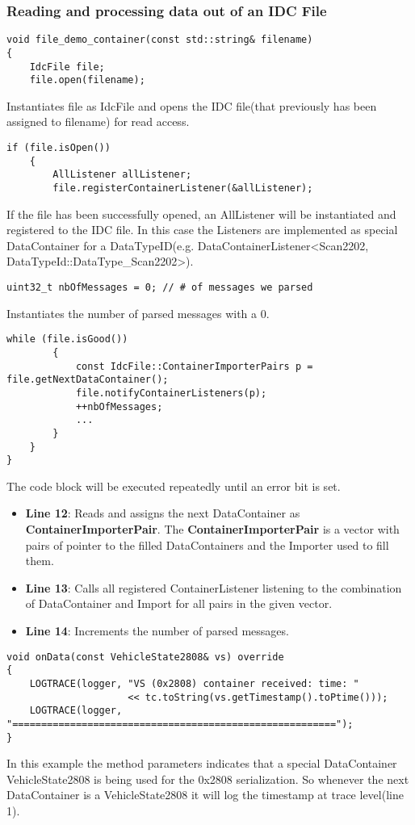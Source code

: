 \subsubsection{Reading and processing data out of an IDC File}
\begin{lstlisting}
void file_demo_container(const std::string& filename)
{
	IdcFile file;
	file.open(filename);
\end{lstlisting}
Instantiates file as IdcFile and opens the IDC file(that previously has been assigned to filename) for read access. 
\begin{lstlisting}[firstnumber=last]
	if (file.isOpen())
	{
		AllListener allListener;
		file.registerContainerListener(&allListener);
\end{lstlisting}
If the file has been successfully opened, an AllListener will be instantiated and registered to the IDC file. In this case the Listeners are implemented as special DataContainer for a DataTypeID(e.g. DataContainerListener<Scan2202, DataTypeId::DataType\_Scan2202>).
\begin{lstlisting}[firstnumber=last]
		uint32_t nbOfMessages = 0; // # of messages we parsed
\end{lstlisting}
Instantiates the number of parsed messages with a 0.
\begin{lstlisting}[firstnumber=last]
		while (file.isGood())
		{
			const IdcFile::ContainerImporterPairs p = file.getNextDataContainer();
			file.notifyContainerListeners(p);
			++nbOfMessages;
			...
		}
	}
}
\end{lstlisting}
The code block will be executed repeatedly until an error bit is set.
\begin{itemize}
	\item \textbf{Line 12}: Reads and assigns the next DataContainer as \textbf{ContainerImporterPair}. The \textbf{ContainerImporterPair} is a vector with pairs of pointer to the filled DataContainers and the Importer used to fill them.
	\item \textbf{Line 13}: Calls all registered ContainerListener listening to the combination of DataContainer and Import for all pairs in the given vector.
	\item \textbf{Line 14}: Increments the number of parsed messages. 
\end{itemize}
\begin{lstlisting}
void onData(const VehicleState2808& vs) override
{
	LOGTRACE(logger, "VS (0x2808) container received: time: " 
	                 << tc.toString(vs.getTimestamp().toPtime()));
	LOGTRACE(logger, "========================================================");
}
\end{lstlisting}
In this example the method parameters indicates that a special DataContainer VehicleState2808 is being used for the 0x2808 serialization. So whenever the next DataContainer is a VehicleState2808 it will log the timestamp at trace level(line 1).
\newpage
